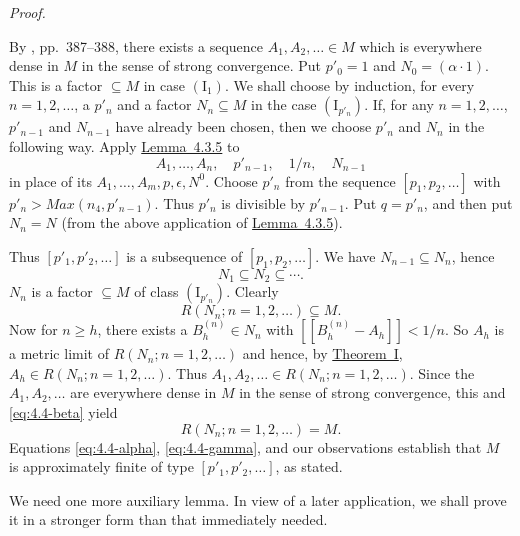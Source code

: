 \documentclass[b5paper,twoside]{article}
\newcommand{\thmref}[2]{\hyperref[#1]{\mbox{Theorem~#2}}}
\newcommand{\lemref}[2]{\hyperref[#1]{\mbox{Lemma~#2}}}
\theoremstyle{mvnplain}
\renewenvironment{proof}[1][Proof]{%
  \par\addvspace{0.35\baselineskip}%
  \noindent\textit{#1.}\ \normalfont\ignorespaces
}{%
  \par\addvspace{0.35\baselineskip}%
}
\newcommand{\M}{\mathbf M}
\newcommand{\N}{\mathbf N}
\newcommand{\R}{\mathbf R}
\newcommand{\Metric}[1]{\left[\!\left[#1\right]\!\right]}
\def\M{M}%
\def\N{N}%
\def\R{R}%
\def\Metric#1{[[#1]]}%
\def\operatorname#1{#1}%
\begin{document}
\begin{proof}
By \cite{ref2}, pp.~387--388, there exists a sequence
\(A_1,A_2,\ldots\in\M\) which is everywhere dense in \(\M\) in the sense of
strong convergence. Put \(p'_0=1\) and \(\N_0=(\alpha\mathbin{\cdot}1)\).
This is a factor \(\subseteq\M\) in case \((\mathrm I_1)\). We shall choose by
induction, for every \(n=1,2,\ldots\), a \(p'_n\) and a factor
\(\N_n\subseteq\M\) in the case \((\mathrm I_{p'_n})\). If, for any
\(n=1,2,\ldots\), \(p'_{n-1}\) and \(\N_{n-1}\) have already been chosen,
then we choose \(p'_n\) and \(\N_n\) in the following way. Apply
\lemref{lem:4.3.5}{4.3.5} to
\[
 A_1,\ldots,A_n,\quad p'_{n-1},\quad 1/n,\quad \N_{n-1}
\]
in place of its \(A_1,\ldots,A_m,p,\epsilon,\N^0\). Choose \(p'_n\) from
the sequence \([p_1,p_2,\ldots]\) with
\(p'_n>\operatorname{Max}(n_4,p'_{n-1})\). Thus \(p'_n\) is divisible by
\(p'_{n-1}\). Put \(q=p'_n\), and then put \(\N_n=\N\) (from the above
application of \lemref{lem:4.3.5}{4.3.5}).

Thus \([p'_1,p'_2,\ldots]\) is a subsequence of \([p_1,p_2,\ldots]\). We
have \(\N_{n-1}\subseteq\N_n\), hence
\begin{equation}\tag{4.4.\(\alpha\)}\label{eq:4.4-alpha}
 \N_1\subseteq\N_2\subseteq\cdots.
\end{equation}
\(\N_n\) is a factor \(\subseteq\M\) of class \((\mathrm I_{p'_n})\). Clearly
\begin{equation}\tag{4.4.\(\beta\)}\label{eq:4.4-beta}
 \R(\N_n;n=1,2,\ldots)\subseteq\M.
\end{equation}
Now for \(n\geq h\), there exists a \(B_h^{(n)}\in\N_n\) with
\(\Metric{B_h^{(n)}-A_h}<1/n\). So \(A_h\) is a metric limit of
\(\R(\N_n;n=1,2,\ldots)\) and hence, by \thmref{thm:I}{I},
\(A_h\in\R(\N_n;n=1,2,\ldots)\). Thus
\(A_1,A_2,\ldots\in\R(\N_n;n=1,2,\ldots)\). Since the
\(A_1,A_2,\ldots\) are everywhere dense in \(\M\) in the sense of strong
convergence, this and \eqref{eq:4.4-beta} yield
\begin{equation}\tag{4.4.\(\gamma\)}\label{eq:4.4-gamma}
 \R(\N_n;n=1,2,\ldots)=\M.
\end{equation}
Equations \eqref{eq:4.4-alpha}, \eqref{eq:4.4-gamma}, and our observations
establish that \(\M\) is approximately finite of type
\([p'_1,p'_2,\ldots]\), as stated.
\end{proof}

We need one more auxiliary lemma. In view of a later application, we shall
prove it in a stronger form than that immediately needed.
\end{document}
